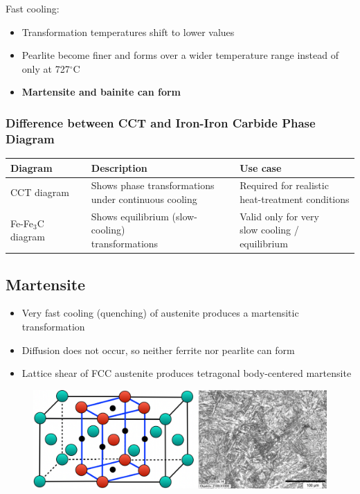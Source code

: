 \documentclass{article}
\begin{document}
Fast cooling:
\begin{itemize}
  \item Transformation temperatures shift to lower values
  \item Pearlite become finer and forms over a wider temperature range instead of only at 727$^\circ$C
  \item \textbf{Martensite and bainite can form}
\end{itemize}

\subsubsection{Difference between CCT and Iron-Iron Carbide Phase Diagram}
{
  \renewcommand{\arraystretch}{2}
  \begin{table}[ht!]
    \centering
    \begin{tabular}{|l|l|l|}
      \hline \textbf{Diagram} & \textbf{Description} & \textbf{Use case}\\
      \hline CCT diagram & \makecell[l]{Shows phase transformations\\under continuous cooling} & \makecell[l]{Required for realistic\\heat-treatment conditions} \\
      \hline Fe-Fe$_3$C diagram & \makecell[l]{Shows equilibrium (slow-cooling)\\transformations} & \makecell[l]{Valid only for very\\slow cooling / equilibrium} \\
      \hline
    \end{tabular}
  \end{table}
}

\newpage
\subsection{Martensite}
\begin{itemize}
  \item Very fast cooling (quenching) of austenite produces a martensitic transformation
  \item Diffusion does not occur, so neither ferrite nor pearlite can form
  \item Lattice shear of FCC austenite produces tetragonal body-centered martensite
\end{itemize}

\begin{figure}[ht!]
  \centering
  \includegraphics[width=.8\textwidth]{media/martensite.png}
\end{figure}
\end{document}
